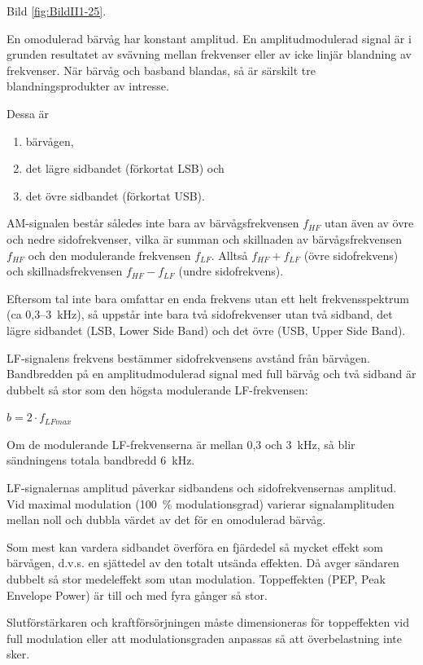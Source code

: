 Bild \ref{fig:BildII1-25}.

En omodulerad bärvåg har konstant amplitud. En amplitudmodulerad signal är i
grunden resultatet av svävning mellan frekvenser eller av icke linjär blandning
av frekvenser. När bärvåg och basband blandas, så är särskilt tre
blandningsprodukter av intresse.

Dessa är

\begin{enumerate}[label=-,noitemsep]
\item bärvågen,
\item det lägre sidbandet (förkortat LSB) och
\item det övre sidbandet (förkortat USB).
\end{enumerate}

AM-signalen består således inte bara av bärvågsfrekvensen \(f_{HF}\) utan även
av övre och nedre sidofrekvenser, vilka är summan och skillnaden av
bärvågsfrekvensen \(f_{HF}\) och den modulerande frekvensen \(f_{LF}\).
Alltså \(f_{HF} + f_{LF}\) (övre sidofrekvens) och skillnadsfrekvensen
\(f_{HF} - f_{LF}\) (undre sidofrekvens).

Eftersom tal inte bara omfattar en enda frekvens utan ett helt frekvensspektrum
(ca 0,3--3~kHz), så uppstår inte bara två sidofrekvenser utan två sidband, det
lägre sidbandet (LSB, Lower Side Band) och det övre (USB, Upper Side Band).

LF-signalens frekvens bestämmer sidofrekvensens avstånd från bärvågen.
Bandbredden på en amplitudmodulerad signal med full bärvåg och två sidband är
dubbelt så stor som den högsta modulerande LF-frekvensen:

\(b= 2 \cdot f_{LFmax}\)

Om de modulerande LF-frekvenserna är mellan 0,3 och 3~kHz, så blir sändningens
totala bandbredd 6~kHz.

LF-signalernas amplitud påverkar sidbandens och sidofrekvensernas amplitud. Vid
maximal modulation (100~\% modulationsgrad) varierar signalamplituden mellan
noll och dubbla värdet av det för en omodulerad bärvåg.

Som mest kan vardera sidbandet överföra en fjärdedel så mycket effekt som
bärvågen, d.v.s. en sjättedel av den totalt utsända effekten. Då avger sändaren
dubbelt så stor medeleffekt som utan modulation. Toppeffekten (PEP,
Peak Envelope Power) är till och med fyra gånger så stor.

Slutförstärkaren och kraftförsörjningen måste dimensioneras för toppeffekten vid
full modulation eller att modulationsgraden anpassas så att överbelastning inte
sker.

